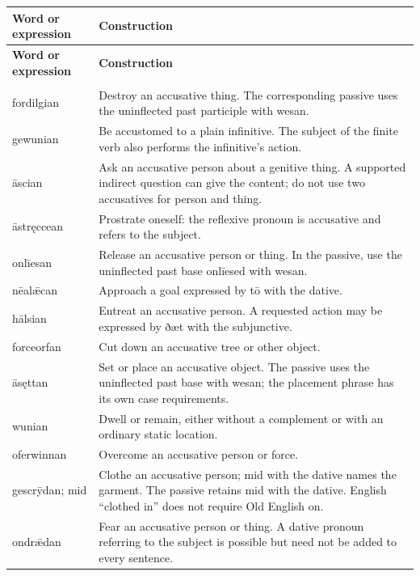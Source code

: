 \par\begingroup
\fontsize{10.5}{13.2}\selectfont
\setlength{\LTleft}{0pt}\setlength{\LTright}{\fill}
\begin{longtable}{@{}>{\raggedright\arraybackslash}p{21.67mm}>{\raggedright\arraybackslash}p{99.52mm}@{}}
\toprule
\textbf{Word or expression} & \textbf{Construction} \\
\midrule
\endfirsthead
\toprule
\textbf{Word or expression} & \textbf{Construction} \\
\midrule
\endhead
\midrule
\multicolumn{2}{r}{\footnotesize Continued on the following page.}\\
\endfoot
\bottomrule
\endlastfoot
fordilgian & Destroy an accusative thing. The corresponding passive uses the uninflected past participle with wesan. \\
gewunian & Be accustomed to a plain infinitive. The subject of the finite verb also performs the infinitive’s action. \\
āscian & Ask an accusative person about a genitive thing. A supported indirect question can give the content; do not use two accusatives for person and thing. \\
āstręccean & Prostrate oneself: the reflexive pronoun is accusative and refers to the subject. \\
onlīesan & Release an accusative person or thing. In the passive, use the uninflected past base onlīesed with wesan. \\
nēalǣcan & Approach a goal expressed by tō with the dative. \\
hālsian & Entreat an accusative person. A requested action may be expressed by ðæt with the subjunctive. \\
forceorfan & Cut down an accusative tree or other object. \\
āsęttan & Set or place an accusative object. The passive uses the uninflected past base with wesan; the placement phrase has its own case requirements. \\
wunian & Dwell or remain, either without a complement or with an ordinary static location. \\
oferwinnan & Overcome an accusative person or force. \\
gescrȳdan; mid & Clothe an accusative person; mid with the dative names the garment. The passive retains mid with the dative. English “clothed in” does not require Old English on. \\
ondrǣdan & Fear an accusative person or thing. A dative pronoun referring to the subject is possible but need not be added to every sentence. \\

\end{longtable}
